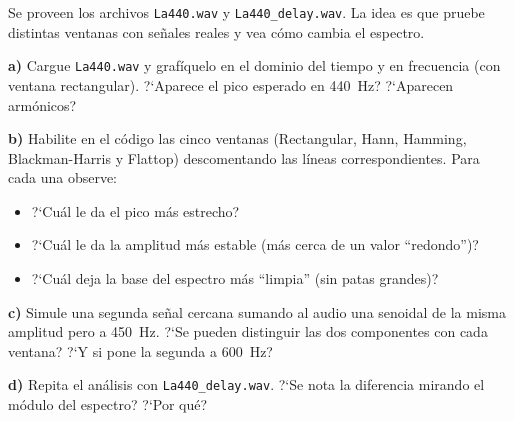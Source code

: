 \documentclass[11pt, a4paper]{article}
\begin{document}
\begin{enun}
Se proveen los archivos \texttt{La440.wav} y \texttt{La440\_delay.wav}.
La idea es que pruebe distintas ventanas con se\~nales reales y vea c\'omo
cambia el espectro.

\textbf{a)} Cargue \texttt{La440.wav} y graf\'iquelo en el dominio del tiempo
y en frecuencia (con ventana rectangular).
?`Aparece el pico esperado en 440~Hz? ?`Aparecen arm\'onicos?

\textbf{b)} Habilite en el c\'odigo las cinco ventanas (Rectangular, Hann,
Hamming, Blackman-Harris y Flattop) descomentando las l\'ineas correspondientes.
Para cada una observe:
\begin{itemize}[noitemsep]
  \item ?`Cu\'al le da el pico m\'as estrecho?
  \item ?`Cu\'al le da la amplitud m\'as estable (m\'as cerca de un valor
    ``redondo'')?
  \item ?`Cu\'al deja la base del espectro m\'as ``limpia'' (sin patas
    grandes)?
\end{itemize}

\textbf{c)} Simule una segunda se\~nal cercana sumando al audio una
senoidal de la misma amplitud pero a 450~Hz.
?`Se pueden distinguir las dos componentes con cada ventana?
?`Y si pone la segunda a 600~Hz?

\textbf{d)} Repita el an\'alisis con \texttt{La440\_delay.wav}.
?`Se nota la diferencia mirando el m\'odulo del espectro?
?`Por qu\'e?
\end{enun}
\end{document}
